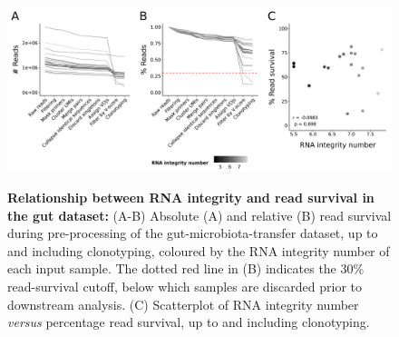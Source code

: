 \begin{figure}
\centering
\includegraphics[width = \textwidth]{_Figures/png/gut-read-survival-all-rin.png}
\begin{subfigure}{0em}
\label{fig:igseq-gut-read-survival-all-rin-abs}
\end{subfigure}
\begin{subfigure}{0em}
\label{fig:igseq-gut-read-survival-all-rin-rel}
\end{subfigure}
\begin{subfigure}{0em}
\label{fig:igseq-gut-read-survival-all-rin-scatter}
\end{subfigure}
\caption[Relationship between RNA integrity and read survival in the gut \igseq dataset]{\textbf{Relationship between RNA integrity and read survival in the gut \igseq dataset:} (A-B) Absolute (A) and relative (B) read survival during pre-processing of the \igseq gut-microbiota-transfer dataset, up to and including clonotyping, coloured by the RNA integrity number of each input sample. The dotted red line in (B) indicates the 30\% read-survival cutoff, below which samples are discarded prior to downstream analysis. (C) Scatterplot of RNA integrity number \textit{versus} percentage read survival, up to and including clonotyping.}
\label{fig:igseq-gut-read-survival-all-rin}
\end{figure}


